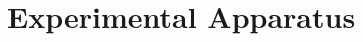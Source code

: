\chapter{Experimental Apparatus}
\label{chap:detector}
\begin{comment}
\section{CMS Detector}
The aim of a particle detector is to count the particles produced that pass through it after being produced in a collision or a decay - an ``event'', to visualise their tracks, to measure their energies and momenta, to record time-of-flight and to identify their identity. The exact position where the event occurs is known as the interaction point. It is neccessary to know the mass and momentum of the particles to identify them. The mass can be found by measuring either the velocity or the energy and the momentum. Depending on the type of the particles and forces to be studied, various detectors have been designed.

In particle physics, a hermetic detector, also known as a 4$\pi$ detector, is a particle detector which is designed to observe all possible decay products of an interaction between subatomic particles in a collider. It covers a large area around the interaction point and  consists of layers of sub-detectors each specialising in a particular type of particle or property. They are typically cylindrical having different types of detectors wrapped around each other. These are known as hermetic because their construction is such that the motion of particles is ceased at the boundaries of the chamber and the particles donot move beyond the seals. These detectors cover solid angle nearly of 4$\pi$ steradians around the interaction point and hence are named as ``4$\pi$'' detectors.

The first 4$\pi$ detector was the ``Mark I'' at the Stanford Linear Accelerator Center (SLAC) which resulted in the discoveries of J/$\psi$ particle and $\tau$ lepton. Its basic design has been used for all modern collider detectors. Prior to the building of the Mark I, it was thought that most particle decay products would have relatively low transverse momentum (i.e. momentum perpendicular to the beamline), so that detectors could cover this area only. However, it was learnt at the Mark I and subsequent experiments that the most fundamental particle interactions at colliders involve very large exchanges of energy and therefore involve large transverse momenta. So the large angular coverage is taken into account for modern particle physics.


\end{comment}
